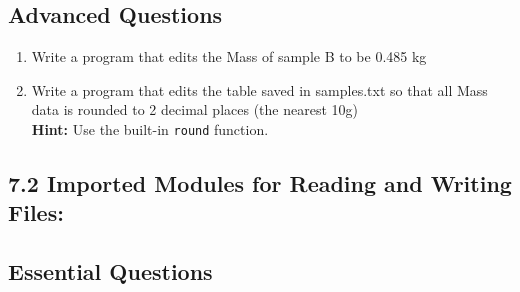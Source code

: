 \documentclass[11pt]{report}
\begin{document}
\subsection*{Advanced Questions}

\begin{enumerate}[label=(\Alph*)]


    \item Write a program that edits the Mass of sample B to be 0.485 kg
    
    \item Write a program that edits the table saved in samples.txt so that all Mass data is rounded to 2 decimal places (the nearest 10g)\\{\bf Hint:} Use the built-in {\tt round} function.
    
    
    

    
    
    

        
    

    
\end{enumerate}

\subsection*{\Large 7.2 Imported Modules for Reading and Writing Files:}

\subsection*{Essential Questions}

\begin{Exercise}[title= Writing csv files]\label{Ex:Writing_csv}

\ExeText{}

	

\end{Exercise}
\end{document}
